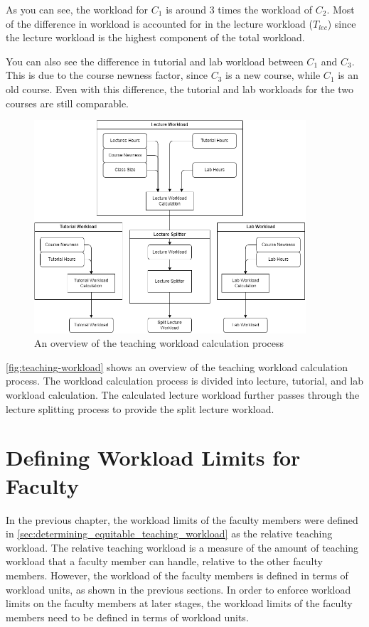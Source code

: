 As you can see, the workload for \(C_1\) is around 3 times the workload of \(C_2\). Most of the difference in workload is accounted for in the lecture workload (\(T_{lec}\)) since the lecture workload is the highest component of the total workload.

You can also see the difference in tutorial and lab workload between \(C_1\) and \(C_3\). This is due to the course newness factor, since \(C_3\) is a new course, while \(C_1\) is an old course. Even with this difference, the tutorial and lab workloads for the two courses are still comparable.

\begin{figure}[ht]
  \centering
  \includegraphics[width=0.9\textwidth]{images/teaching_workload.png}
  \caption{An overview of the teaching workload calculation process}
  \label{fig:teaching-workload}
\end{figure}

\autoref{fig:teaching-workload} shows an overview of the teaching workload calculation process. The workload calculation process is divided into lecture, tutorial, and lab workload calculation. The calculated lecture workload further passes through the lecture splitting process to provide the split lecture workload.


\section{Defining Workload Limits for Faculty}

In the previous chapter, the workload limits of the faculty members were defined in \autoref{sec:determining_equitable_teaching_workload} as the relative teaching workload. The relative teaching workload is a measure of the amount of teaching workload that a faculty member can handle, relative to the other faculty members. However, the workload of the faculty members is defined in terms of workload units, as shown in the previous sections. In order to enforce workload limits on the faculty members at later stages, the workload limits of the faculty members need to be defined in terms of workload units.

